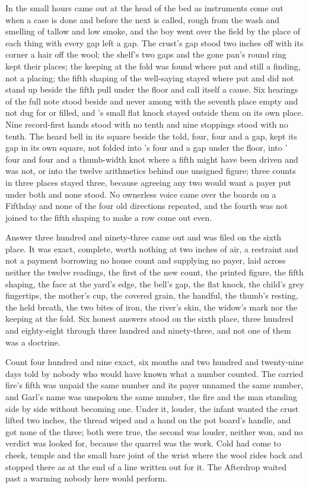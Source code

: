 In the small hours  came out at the head of the bed as instruments come out when a case is done and before the next is called, rough from the wash and smelling of tallow and low smoke, and the boy went over the field by the place of each thing with every gap left a gap. The crust's gap stood two inches off with its corner a hair off the wool; the shelf's two gaps and the gone pan's round ring kept their places; the keeping at the fold was found where put and still a finding, not a placing; the fifth shaping of the well-saying stayed where put and did not stand up beside the fifth pull under the floor and call itself a cause. Six hearings of the full note stood beside and never among with the seventh place empty and not dug for or filled, and 's small flat knock stayed outside them on its own place. Nine record-first hands stood with no tenth and nine stoppings stood with no tenth. The heard bell in its square beside the told, four, four and a gap, kept its gap in its own square, not folded into 's four and a gap under the floor, into ' four and four and a thumb-width knot where a fifth might have been driven and was not, or into the twelve arithmetics behind one unsigned figure; three counts in three places stayed three, because agreeing any two would want a payer put under both and none stood. No ownerless voice came over the boards on a Fifthday and none of the four old directions repeated, and the fourth was not joined to the fifth shaping to make a row come out even.

Answer three hundred and ninety-three came out and was filed on the sixth place. It was exact, complete, worth nothing at two inches of air, a restraint and not a payment borrowing no house count and supplying no payer, laid across neither the twelve readings, the first of the new count, the printed figure, the fifth shaping, the face at the yard's edge, the bell's gap, the flat knock, the child's grey fingertips, the mother's cup, the covered grain, the handful, the thumb's resting, the held breath, the two bites of iron, the river's skin, the widow's mark nor the keeping at the fold. Six honest answers stood on the sixth place, three hundred and eighty-eight through three hundred and ninety-three, and not one of them was a doctrine.

Count four hundred and nine exact, six months and two hundred and twenty-nine days told by nobody who would have known what a number counted. The carried fire's fifth was unpaid the same number and its payer unnamed the same number, and Garl's name was unspoken the same number, the fire and the man standing side by side without becoming one. Under it, louder, the infant wanted the crust lifted two inches, the thread wiped and a hand on the pot board's handle, and got none of the three; both were true, the second was louder, neither won, and no verdict was looked for, because the quarrel was the work. Cold had come to cheek, temple and the small bare joint of the wrist where the wool rides back and stopped there as at the end of a line written out for it. The Afterdrop waited past a warming nobody here would perform.

